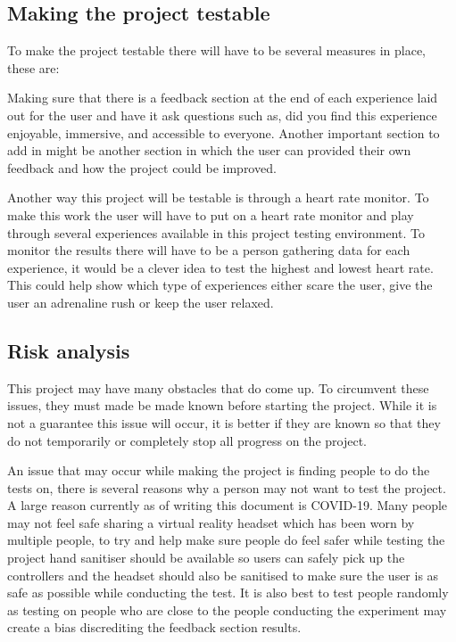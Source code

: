 \subsection{Making the project testable}
To make the project testable there will have to be several measures in place, these are: 

Making sure that there is a feedback section at the end of each experience laid out for the user and have it ask questions such as, did you find this experience enjoyable, immersive, and accessible to everyone. Another important section to add in might be another section in which the user can provided their own feedback and how the project could be improved. 

Another way this project will be testable is through a heart rate monitor. To make this work the user will have to put on a heart rate monitor and play through several experiences available in this project testing environment. To monitor the results there will have to be a person gathering data for each experience, it would be a clever idea to test the highest and lowest heart rate. This could help show which type of experiences either scare the user, give the user an adrenaline rush or keep the user relaxed. 

\subsection{Risk analysis}
This project may have many obstacles that do come up. To circumvent these issues, they must made be made known before starting the project. While it is not a guarantee this issue will occur, it is better if they are known so that they do not temporarily or completely stop all progress on the project. 

An issue that may occur while making the project is finding people to do the tests on, there is several reasons why a person may not want to test the project. A large reason currently as of writing this document is COVID-19. Many people may not feel safe sharing a virtual reality headset which has been worn by multiple people, to try and help make sure people do feel safer while testing the project hand sanitiser should be available so users can safely pick up the controllers and the headset should also be sanitised to make sure the user is as safe as possible while conducting the test. It is also best to test people randomly as testing on people who are close to the people conducting the experiment may create a bias discrediting the feedback section results.  

